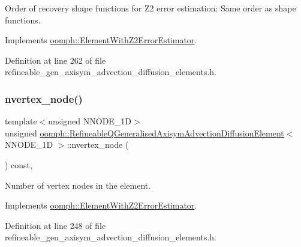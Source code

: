 Order of recovery shape functions for Z2 error estimation\+: Same order as shape functions. 



Implements \hyperlink{classoomph_1_1ElementWithZ2ErrorEstimator_af39480835bd3e0f6b2f4f7a9a4044798}{oomph\+::\+Element\+With\+Z2\+Error\+Estimator}.



Definition at line 262 of file refineable\+\_\+gen\+\_\+axisym\+\_\+advection\+\_\+diffusion\+\_\+elements.\+h.

\mbox{\label{classoomph_1_1RefineableQGeneralisedAxisymAdvectionDiffusionElement_aa14f82deb49cf2910b0b15522f48f5a0}} 
\subsubsection{\texorpdfstring{nvertex\+\_\+node()}{nvertex\_node()}}
{\footnotesize\ttfamily template$<$unsigned N\+N\+O\+D\+E\+\_\+1D$>$ \\
unsigned \hyperlink{classoomph_1_1RefineableQGeneralisedAxisymAdvectionDiffusionElement}{oomph\+::\+Refineable\+Q\+Generalised\+Axisym\+Advection\+Diffusion\+Element}$<$ N\+N\+O\+D\+E\+\_\+1D $>$\+::nvertex\+\_\+node (\begin{DoxyParamCaption}{ }\end{DoxyParamCaption}) const\hspace{0.3cm}{\ttfamily [inline]}, {\ttfamily [virtual]}}



Number of vertex nodes in the element. 



Implements \hyperlink{classoomph_1_1ElementWithZ2ErrorEstimator_a19495a0e77ef4ff35f15fdf7913b4077}{oomph\+::\+Element\+With\+Z2\+Error\+Estimator}.



Definition at line 248 of file refineable\+\_\+gen\+\_\+axisym\+\_\+advection\+\_\+diffusion\+\_\+elements.\+h.

\mbox{\label{classoomph_1_1RefineableQGeneralisedAxisymAdvectionDiffusionElement_aad29ba9341305fbb451f3825aa3f8d03}} 
